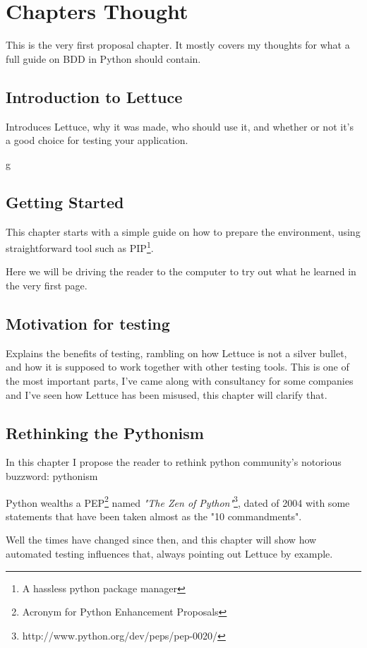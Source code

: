 \documentclass[letterpaper]{article}
\begin{document}
\section*{Chapters Thought}
This is the very first proposal chapter. It mostly covers my
thoughts for what a full guide on BDD in Python should contain.

\subsection*{Introduction to Lettuce}
\noindent
Introduces Lettuce, why it was made, who should use it, and
whether or not it's a good choice for testing your application.

g\subsection*{Getting Started}
This chapter starts with a simple guide on how to prepare the environment, using straightforward tool such as PIP\footnote{A hassless python package manager}.

Here we will be driving the reader to the computer to try out what he
learned in the very first page.

\subsection*{Motivation for testing}
Explains the benefits of testing, rambling on how Lettuce is not a
silver bullet, and how it is supposed to work together with other
testing tools.
This is one of the most important parts, I've came along with
consultancy for some companies and I've seen how Lettuce has been
misused, this chapter will clarify that.

\subsection*{Rethinking the Pythonism}
In this chapter I propose the reader to rethink python community's
notorious buzzword: pythonism

Python wealths a PEP\footnote{Acronym for Python Enhancement
 Proposals} named \textit{"The Zen of Python"}\footnote{http://www.python.org/dev/peps/pep-0020/}, dated of 2004 with some statements that have been taken almost as the "10 commandments".

Well the times have changed since then, and this chapter will show how
automated testing influences that, always pointing out Lettuce by
example.
\end{document}
